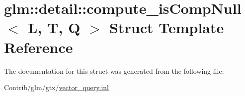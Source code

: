 \hypertarget{structglm_1_1detail_1_1compute__is_comp_null}{}\section{glm\+:\+:detail\+:\+:compute\+\_\+is\+Comp\+Null$<$ L, T, Q $>$ Struct Template Reference}
\label{structglm_1_1detail_1_1compute__is_comp_null}


The documentation for this struct was generated from the following file\+:\begin{DoxyCompactItemize}
\item 
Contrib/glm/gtx/\mbox{\hyperlink{vector__query_8inl}{vector\+\_\+query.\+inl}}\end{DoxyCompactItemize}
